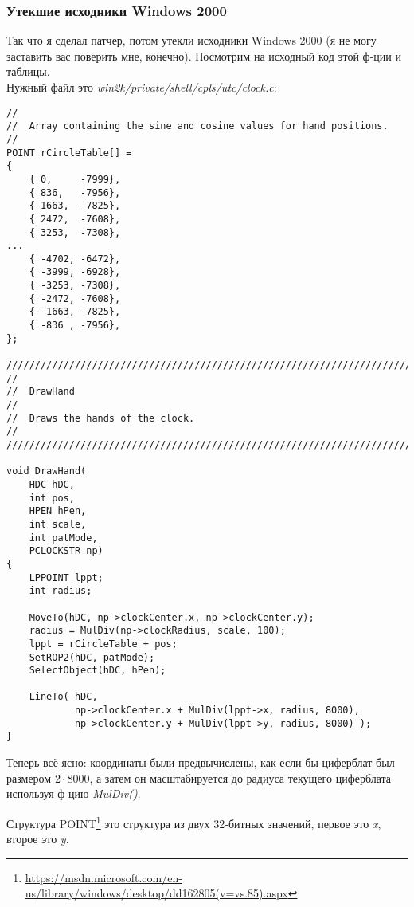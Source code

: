 \subsubsection{Утекшие исходники Windows 2000}

Так что я сделал патчер, потом утекли исходники Windows 2000 (я не могу заставить вас поверить мне, конечно).
Посмотрим на исходный код этой ф-ции и таблицы.\\
Нужный файл это \emph{win2k/private/shell/cpls/utc/clock.c}:

\begin{lstlisting}[style=customc]
//
//  Array containing the sine and cosine values for hand positions.
//
POINT rCircleTable[] =
{
    { 0,     -7999},
    { 836,   -7956},
    { 1663,  -7825},
    { 2472,  -7608},
    { 3253,  -7308},
...
    { -4702, -6472},
    { -3999, -6928},
    { -3253, -7308},
    { -2472, -7608},
    { -1663, -7825},
    { -836 , -7956},
};

////////////////////////////////////////////////////////////////////////////
//
//  DrawHand
//
//  Draws the hands of the clock.
//
////////////////////////////////////////////////////////////////////////////

void DrawHand(
    HDC hDC,
    int pos,
    HPEN hPen,
    int scale,
    int patMode,
    PCLOCKSTR np)
{
    LPPOINT lppt;
    int radius;

    MoveTo(hDC, np->clockCenter.x, np->clockCenter.y);
    radius = MulDiv(np->clockRadius, scale, 100);
    lppt = rCircleTable + pos;
    SetROP2(hDC, patMode);
    SelectObject(hDC, hPen);

    LineTo( hDC,
            np->clockCenter.x + MulDiv(lppt->x, radius, 8000),
            np->clockCenter.y + MulDiv(lppt->y, radius, 8000) );
}
\end{lstlisting}

Теперь всё ясно: координаты были предвычислены, как если бы циферблат был размером $2 \cdot 8000$,
а затем он масштабируется до радиуса текущего циферблата используя ф-цию \emph{MulDiv()}.

Структура POINT\footnote{\url{https://msdn.microsoft.com/en-us/library/windows/desktop/dd162805(v=vs.85).aspx}}
это структура из двух 32-битных значений, первое это \emph{x}, второе это \emph{y}.

